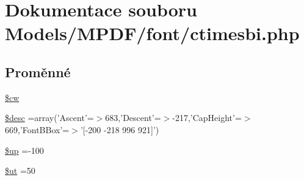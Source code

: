 \hypertarget{ctimesbi_8php}{\section{Dokumentace souboru Models/\-M\-P\-D\-F/font/ctimesbi.php}
\label{ctimesbi_8php}
}
\subsection*{Proměnné}
\begin{DoxyCompactItemize}
\item 
\hyperlink{ctimesbi_8php_ac2951b03dbb0317e6c61ec920b7479dc}{\$cw}
\item 
\hyperlink{ctimesbi_8php_a31059b9e4d0c5af34df20da32232ea9a}{\$desc} =array('Ascent'=$>$683,'Descent'=$>$-\/217,'Cap\-Height'=$>$669,'Font\-B\-Box'=$>$'\mbox{[}-\/200 -\/218 996 921\mbox{]}')
\item 
\hyperlink{ctimesbi_8php_a6b5ad2ac55f9df46e8f34e78fbd6f176}{\$up} =-\/100
\item 
\hyperlink{ctimesbi_8php_aadd3f841051043ee58e587e840e8dd0b}{\$ut} =50
\item 

\end{DoxyCompactItemize}
